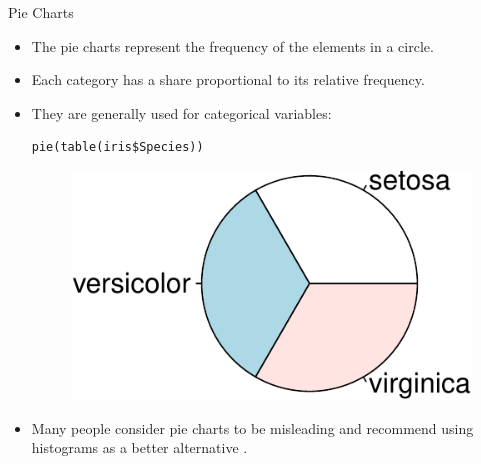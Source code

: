 \documentclass[handout]{beamer}
\begin{document}
\begin{frame}[fragile]{Pie Charts }
\scriptsize{
\begin{itemize}
 \item The pie charts represent the frequency of the elements in a circle.
 \item Each category has a share proportional to its relative frequency.
 \item They are generally used for categorical variables:
 \begin{verbatim}
pie(table(iris$Species))
 \end{verbatim}
 \begin{figure}[h!]
	\centering
	\includegraphics[scale=0.6]{pics/piechart.pdf}
	
	
\end{figure} 

\item Many people consider pie charts to be misleading and recommend using histograms as a better alternative \cite{poldrack2019statistical}.

\end{itemize}




}
\end{frame}
\end{document}
